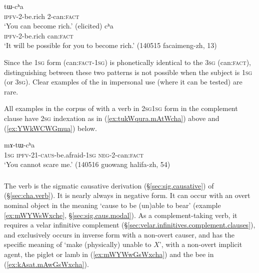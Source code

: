 \begin{exe}
 \ex
\begin{xlist}
\ex \label{ex:chWtWmACi.tWcha}
  tɯ-cʰa \\
 \textsc{ipfv}-2-be.rich 2-can:\textsc{fact} \\
 \glt `You can become rich.' (elicited)
 \ex \label{ex:chWtWmACi.cha}
  cʰa \\
 \textsc{ipfv}-2-be.rich can:\textsc{fact} \\
 \glt `It will be possible for you to become rich.' (140515 facaimeng-zh, 13)
\end{xlist}
\end{exe}
  
 Since the \textsc{1sg} form  (can:\textsc{fact}-\textsc{1sg}) is phonetically identical to the \textsc{3sg}  (can:\textsc{fact}), distinguishing between these two patterns is not possible when the subject is \textsc{1sg} (or \textsc{3sg}). Clear examples of the  in impersonal use (where it can be tested) are rare.
 
All examples in the corpus of  with a verb in \textsc{2sg}\fl{}\textsc{1sg} form in the complement clause have \textsc{2sg} indexation as in (\ref{ex:tukWqura.mAtWcha}) above and (\ref{ex:YWkWCWGmua}) below.

\begin{exe}
\ex \label{ex:YWkWCWGmua}
 mɤ-tɯ-cʰa  \\  
  \textsc{1sg} \textsc{ipfv}-2\fl{}1-\textsc{caus}-be.afraid-\textsc{1sg} \textsc{neg}-2-can:\textsc{fact} \\
\glt `You cannot scare me.' (140516 guowang halifa-zh, 54)
  \end{exe}


\subsubsection{} \label{sec:sWxcha}
The verb  is the sigmatic causative derivation (§\ref{sec:sig.causative}) of  (§\ref{sec:cha.verb}). It is nearly always in negative form. It can occur with an overt nominal object in the meaning `cause to be (un)able to bear' (example \ref{ex:mWYWsWxche}, §\ref{sec:sig.caus.modal}). As a complement-taking verb, it requires a velar infinitive complement (§\ref{sec:velar.infinitives.complement.clauses}), and exclusively occurs in inverse form with a non-overt causer, and has the specific meaning of `make (physically) unable to $X$', with a non-overt implicit agent, the piglet or lamb in (\ref{ex:mWYWwGsWxcha}) and the bee in (\ref{ex:kAsat.mAwGsWxcha}).

